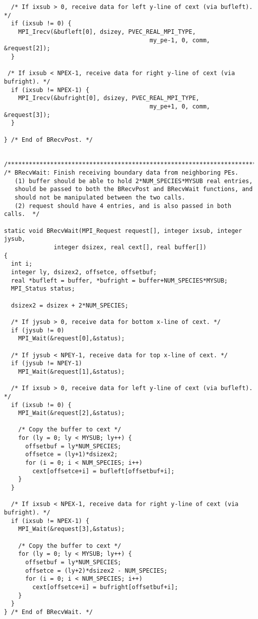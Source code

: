 \documentclass[11pt]{article}
\begin{document}
\begin{verbatim}
  /* If ixsub > 0, receive data for left y-line of cext (via bufleft). */
  if (ixsub != 0) {
    MPI_Irecv(&bufleft[0], dsizey, PVEC_REAL_MPI_TYPE,
                                         my_pe-1, 0, comm, &request[2]);
  }

 /* If ixsub < NPEX-1, receive data for right y-line of cext (via bufright). */
  if (ixsub != NPEX-1) {
    MPI_Irecv(&bufright[0], dsizey, PVEC_REAL_MPI_TYPE,
                                         my_pe+1, 0, comm, &request[3]);
  }

} /* End of BRecvPost. */


/*************************************************************************/
/* BRecvWait: Finish receiving boundary data from neighboring PEs.
   (1) buffer should be able to hold 2*NUM_SPECIES*MYSUB real entries,
   should be passed to both the BRecvPost and BRecvWait functions, and
   should not be manipulated between the two calls.
   (2) request should have 4 entries, and is also passed in both calls.  */

static void BRecvWait(MPI_Request request[], integer ixsub, integer jysub,
              integer dsizex, real cext[], real buffer[])
{
  int i;
  integer ly, dsizex2, offsetce, offsetbuf;
  real *bufleft = buffer, *bufright = buffer+NUM_SPECIES*MYSUB;
  MPI_Status status;

  dsizex2 = dsizex + 2*NUM_SPECIES;

  /* If jysub > 0, receive data for bottom x-line of cext. */
  if (jysub != 0)
    MPI_Wait(&request[0],&status);

  /* If jysub < NPEY-1, receive data for top x-line of cext. */
  if (jysub != NPEY-1)
    MPI_Wait(&request[1],&status);

  /* If ixsub > 0, receive data for left y-line of cext (via bufleft). */
  if (ixsub != 0) {
    MPI_Wait(&request[2],&status);

    /* Copy the buffer to cext */
    for (ly = 0; ly < MYSUB; ly++) {
      offsetbuf = ly*NUM_SPECIES;
      offsetce = (ly+1)*dsizex2;
      for (i = 0; i < NUM_SPECIES; i++)
        cext[offsetce+i] = bufleft[offsetbuf+i];
    }
  }

  /* If ixsub < NPEX-1, receive data for right y-line of cext (via bufright). */
  if (ixsub != NPEX-1) {
    MPI_Wait(&request[3],&status);

    /* Copy the buffer to cext */
    for (ly = 0; ly < MYSUB; ly++) {
      offsetbuf = ly*NUM_SPECIES;
      offsetce = (ly+2)*dsizex2 - NUM_SPECIES;
      for (i = 0; i < NUM_SPECIES; i++)
        cext[offsetce+i] = bufright[offsetbuf+i];
    }
  }
} /* End of BRecvWait. */
      


\end{verbatim}
\end{document}
